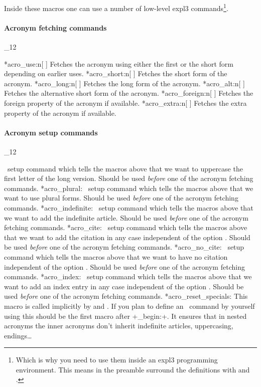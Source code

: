 \documentclass[load-preamble+]{cnltx-doc}
\makeatletter
\renewenvironment{commands}
  {%
    \cnltx@set@catcode_{12}%
    \let\command\cnltx@command
    \cnltxlist
  }
  {\endcnltxlist}
\makeatother
\begin{document}
Inside these macros one can use a number of low-level expl3
commands\footnote{Which is why you need to use them inside an expl3
  programming environment.  This means in the preamble surround the
  definitions with  and .}.

\paragraph{Acronym fetching commands}
\begin{commands}
  \command*{acro_use:n}[ ]
    Fetches the acronym using either the first or the short form depending on
    earlier uses.
  \command*{acro_short:n}[ ]
    Fetches the short form of the acronym.
  \command*{acro_long:n}[ ]
    Fetches the long form of the acronym.
  \command*{acro_alt:n}[ ]
    Fetches the alternative short form of the acronym.
  \command*{acro_foreign:n}[ ]
    Fetches the foreign property of the acronym if available.
  \command*{acro_extra:n}[ ]
    Fetches the extra property of the acronym if available.
\end{commands}

\paragraph{Acronym setup commands}
\begin{commands}
  \command*{acro_first_upper:}
    \acro\ setup command which tells the macros above that we want to
    uppercase the first letter of the long version.  Should be used
    \emph{before} one of the acronym fetching commands.
  \command*{acro_plural:}
    \acro\ setup command which tells the macros above that we want to use
    plural forms. Should be used \emph{before} one of the acronym fetching
    commands.
  \command*{acro_indefinite:}
    \acro\ setup command which tells the macros above that we want to add the
    indefinite article.  Should be used \emph{before} one of the acronym
    fetching commands.
  \command*{acro_cite:}
    \acro\ setup command which tells the macros above that we want to add the
    citation in any case independent of the option .  Should be
    used \emph{before} one of the acronym fetching commands.
  \command*{acro_no_cite:}
    \acro\ setup command which tells the macros above that we want to have no
    citation independent of the option .  Should be used
    \emph{before} one of the acronym fetching commands.
  \command*{acro_index:}
    \acro\ setup command which tells the macros above that we want to add an
    index entry in any case independent of the option .  Should
    be used \emph{before} one of the acronym fetching commands.
  \command*{acro_reset_specials:}
    This macro is called implicitly by 
    and .  If you plan to define an \acro\ command by
    yourself using  this should be the first macro
    after \verbcode+\acro_begin:+.  It ensures that in nested acronyms the
    inner acronyms don't inherit indefinite articles, uppercasing,
    endings\ldots
\end{commands}
\end{document}
